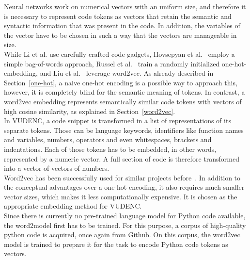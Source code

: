 \documentclass[
a4paper,
pagesize,
pdftex,
12pt,
twoside, %
BCOR=5mm, %
ngerman,
fleqn,
final,
]{scrartcl}
\begin{document}
	Neural networks work on numerical vectors with an uniform size, and therefore it is necessary to represent code tokens as vectors that retain the semantic and syntactic information that was present in the code. In addition, the variables of the vector have to be chosen in such a way that the vectors are manageable in size.\\
	While Li et al.\cite{Li.2018} use carefully crafted code gadgets, Hovsepyan et al.~\cite{Hovsepyan.2012} employ a simple bag-of-words approach, Russel et al.~\cite{Russell.2018} train a randomly initialized one-hot-embedding, and Liu et al.~\cite{Liu.2018} leverage word2vec. As already described in Section~\ref{one-hot}, a naive one-hot encoding is a possible way to approach this, however, it is completely blind for the semantic meaning of tokens. In contrast, a word2vec embedding represents semantically similar code tokens with vectors of high cosine similarity, as explained in Section~\ref{word2vec}.\\
	In VUDENC, a code snippet is transformed in a list of representations of its separate tokens. Those can be language keywords, identifiers like function names and variables, numbers, operators and even whitespaces, brackets and indentations. Each of those tokens has to be embedded, in other words, represented by a numeric vector. A full section of code is therefore transformed into a vector of vectors of numbers.\\
	Word2vec has been successfully used for similar projects before~\cite{Liu.2018}. In addition to the conceptual advantages over a one-hot encoding, it also requires much smaller vector sizes, which makes it less computationally expensive. It is chosen as the appropriate embedding method for VUDENC.\\
	Since there is currently no pre-trained language model for Python code available, the word2model first has to be trained. For this purpose, a corpus of high-quality python code is acquired, once again from Github. On this corpus, the word2vec model is trained to prepare it for the task to encode Python code tokens as vectors.
	
\end{document}
